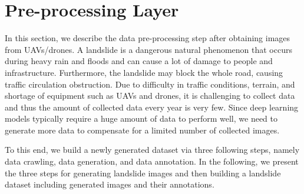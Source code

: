 \documentclass{ieeeaccess}
\begin{document}
\section{Pre-processing Layer}
\label{sec:3}
In this section, we describe the data pre-processing step after obtaining images from UAVs/drones. A landslide is a dangerous natural phenomenon that occurs during heavy rain and floods and can cause a lot of damage to people and infrastructure. Furthermore, the landslide may block the whole road, causing traffic circulation obstruction. 
Due to difficulty in traffic conditions, terrain, and shortage of equipment such as UAVs and drones, it is challenging to collect data and thus the amount of collected data every year is very few. Since deep learning models typically require a huge amount of data to perform well, we need to generate more data to compensate for a limited number of collected images. 

To this end, we build a newly generated dataset via three following steps, namely data crawling, data generation, and data annotation. In the following, we present the three steps for generating landslide images and then building a landslide dataset including generated images and their annotations.
\end{document}
